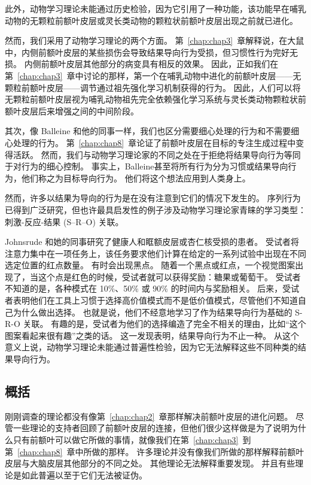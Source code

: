 此外，动物学习理论未能通过历史检验，因为它引用了一种功能，该功能早在哺乳动物的无颗粒前额叶皮层或灵长类动物的颗粒状前额叶皮层出现之前就已进化。
\par


然而，我们采用了动物学习理论的两个方面。
第~\ref{chap:chap3}~章解释说，在大鼠中，内侧前额叶皮层的某些损伤会导致结果导向行为受损，但习惯性行为完好无损。
内侧前额叶皮层其他部分的病变具有相反的效果。
因此，正如我们在第~\ref{chap:chap3}~章中讨论的那样，第一个在哺乳动物中进化的前额叶皮层——无颗粒前额叶皮层——调节通过祖先强化学习机制获得的行为。
因此，人们可以将无颗粒前额叶皮层视为哺乳动物祖先完全依赖强化学习系统与灵长类动物颗粒状前额叶皮层后来增强之间的中间阶段。
\par


其次，像 Balleine 和他的同事一样，我们也区分需要细心处理的行为和不需要细心处理的行为。
第~\ref{chap:chap8}~章论证了前额叶皮层在目标的专注生成过程中变得活跃。
然而，我们与动物学习理论家的不同之处在于拒绝将结果导向行为等同于对行为的细心控制。
事实上，Balleine\cite{balleine2010human}甚至将所有行为分为习惯或结果导向行为，他们称之为目标导向行为。
他们将这个想法应用到人类身上。
\par


然而，许多以结果为导向的行为是在没有注意到它们的情况下发生的。
序列行为已得到广泛研究，但也许最具启发性的例子涉及动物学习理论家青睐的学习类型：刺激-反应-结果 (S–R–O) 关联。
\par


Johnsrude 和她的同事\cite{johnsrude2000impaired}研究了健康人和眶额皮层或杏仁核受损的患者。
受试者将注意力集中在一项任务上，该任务要求他们计算在给定的一系列试验中出现在不同选定位置的红点数量。
有时会出现黑点。
随着一个黑点或红点，一个视觉图案出现了，当这个点是红色的时候，受试者就可以获得奖励：糖果或葡萄干。
受试者不知道的是，各种模式在 10$\%$、50$\%$ 或 90$\%$ 的时间内与奖励相关。
后来，受试者表明他们在工具上习惯于选择高价值模式而不是低价值模式，尽管他们不知道自己为什么做出选择。
也就是说，他们不经意地学习了作为结果导向行为基础的 S-R-O 关联。
有趣的是，受试者为他们的选择编造了完全不相关的理由，比如“这个图案看起来很有趣”之类的话。
这一发现表明，结果导向行为不止一种。
从这个意义上说，动物学习理论未能通过普遍性检验，因为它无法解释这些不同种类的结果导向行为。



\subsection{概括}

刚刚调查的理论都没有像第~\ref{chap:chap2}~章那样解决前额叶皮层的进化问题。
尽管一些理论的支持者回顾了前额叶皮层的连接，但他们很少这样做是为了说明为什么只有前额叶可以做它所做的事情，就像我们在第~\ref{chap:chap3}~到第~\ref{chap:chap8}~章中所做的那样。
许多理论并没有像我们所做的那样解释前额叶皮层与大脑皮层其他部分的不同之处。
其他理论无法解释重要发现。 并且有些理论是如此普遍以至于它们无法被证伪。



